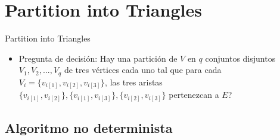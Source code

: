 \renewcommand{\sectiontitle}{Partition into Triangles}
\section{\sectiontitle}

\begin{frame}{\sectiontitle}
    \begin{itemize}
        \itemj Ejemplar genérico: Una gráfica $G=(V,E)$, con $|V|=3q$ para un entero positivo $q$.
        \item Pregunta de decisión: Hay una partición de $V$ en $q$ conjuntos disjuntos $V_1,V_2,...,V_q$ de tres vértices cada uno tal que para cada $V_i=\{v_{i[1]},v_{i[2]},v_{i[3]}\}$, las tres aristas $\{v_{i[1]},v_{i[2]}\},\{v_{i[1]},v_{i[3]}\},\{v_{i[2]},v_{i[3]}\}$ pertenezcan a $E$?
    \end{itemize}
\end{frame}

\renewcommand{\subsectiontitle}{Algoritmo no determinista}
\subsection{\subsectiontitle}

